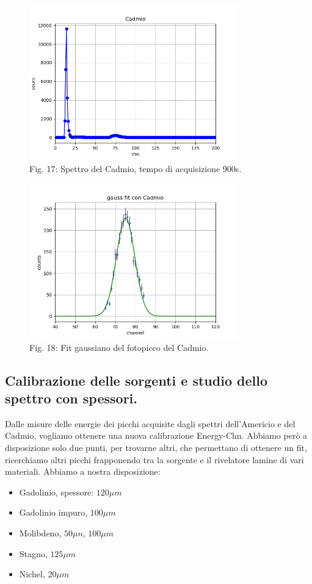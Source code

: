 \documentclass[a4paper]{article}
\begin{document}
\begin{figure}[H]
\includegraphics[width=0.8\textwidth]{cadmio.png}
        \caption{Fig. 17: Spettro del Cadmio, tempo di acquisizione 900s.}
        \label{fig:17}
\end{figure}
\begin{figure}[H]
\includegraphics[width=0.8\textwidth]{fit_gaussiano_con_Cadmio.png}
        \caption{Fig. 18: Fit gaussiano del fotopicco del Cadmio.}
        \label{fig:18}
\end{figure}
\subsection{Calibrazione delle sorgenti e studio dello spettro con spessori.}

Dalle misure delle energie dei picchi acquisite dagli spettri dell'Americio e del Cadmio, vogliamo ottenere una nuova calibrazione Energy-Chn. Abbiamo però a disposizione solo due punti, per trovarne altri, che permettano di ottenere un fit, ricerchiamo altri picchi frapponendo tra la sorgente e il rivelatore lamine di vari materiali. Abbiamo a nostra disposizione:
\begin{itemize}
\item Gadolinio, spessore: $120 \mu m$
\item Gadolinio impuro, $100 \mu m$
\item Molibdeno, $50 \mu n$, $100 \mu m$
\item Stagno, $125 \mu m$
\item Nichel, $20 \mu m$
\end{itemize}
\end{document}
